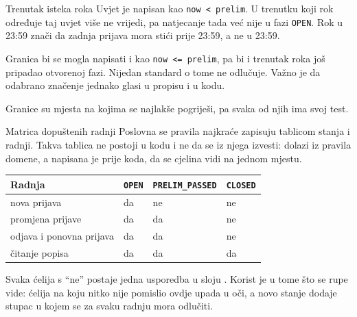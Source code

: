\begin{frame}{Trenutak isteka roka}
Uvjet je napisan kao \texttt{now < prelim}. U trenutku koji rok određuje taj uvjet više ne vrijedi, pa natjecanje tada već nije u fazi \texttt{OPEN}. Rok u 23:59 znači da zadnja prijava mora stići prije 23:59, a ne u 23:59.

\vspace{0.9em}
\begin{konvencija}
Granica bi se mogla napisati i kao \texttt{now <= prelim}, pa bi i trenutak roka još pripadao otvorenoj fazi. Nijedan standard o tome ne odlučuje. Važno je da odabrano značenje jednako glasi u propisu i u kodu.
\end{konvencija}

\vspace{0.9em}
Granice su mjesta na kojima se najlakše pogriješi, pa svaka od njih ima svoj test.
\end{frame}

\begin{frame}{Matrica dopuštenih radnji}
Poslovna se pravila najkraće zapisuju tablicom stanja i radnji. Takva tablica ne postoji u kodu i ne da se iz njega izvesti: dolazi iz pravila domene, a napisana je prije koda, da se cjelina vidi na jednom mjestu.

\vspace{0.5em}
\begin{center}
{\small
\setlength{\tabcolsep}{4pt}
\renewcommand{\arraystretch}{1.4}
\begin{tabular}{@{}L{4.1cm}L{2.0cm}L{2.7cm}L{2.0cm}@{}}
  \toprule
  \textbf{Radnja} & \texttt{OPEN} & \texttt{PRELIM\_PASSED} & \texttt{CLOSED} \\
  \midrule
  nova prijava          & da & ne & ne \\
  promjena prijave      & da & da & ne \\
  odjava i ponovna prijava & da & da & ne \\
  čitanje popisa        & da & da & da \\
  \bottomrule
\end{tabular}
}
\end{center}

\vspace{0.6em}
Svaka ćelija s \enquote{ne} postaje jedna usporedba u sloju . Korist je u tome što se rupe vide: ćelija na koju nitko nije pomislio ovdje upada u oči, a novo stanje dodaje stupac u kojem se za svaku radnju mora odlučiti.
\end{frame}

